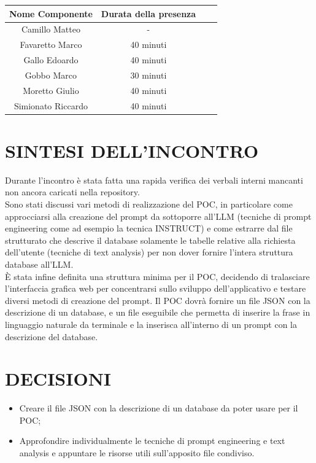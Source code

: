 \documentclass[5pt]{article}
\begin{document}
	\begin{table}[ht]
		\begin{tabular}{|Sc|Sc|}
			\hline
			\textbf{Nome Componente} & \textbf{Durata della presenza} \\
			\hline
			Camillo Matteo & - \\
			Favaretto Marco & 40 minuti \\
			Gallo Edoardo & 40 minuti \\
			Gobbo Marco & 30 minuti \\
			Moretto Giulio & 40 minuti \\
			Simionato Riccardo & 40 minuti \\
			\hline
		\end{tabular}
		\label{tab:conference}
	\end{table}
	
	\section{SINTESI DELL'INCONTRO}
	Durante l'incontro è stata fatta una rapida verifica dei verbali interni mancanti non ancora caricati nella repository.\\
	Sono stati discussi vari metodi di realizzazione del POC, in particolare come approcciarsi alla creazione del prompt da sottoporre all'LLM (tecniche di prompt engineering come ad esempio la tecnica INSTRUCT) e come estrarre dal file strutturato che descrive il database solamente le tabelle relative alla richiesta dell'utente (tecniche di text analysis) per non dover fornire l'intera struttura database all'LLM.\\
	È stata infine definita una struttura minima per il POC, decidendo di tralasciare l'interfaccia grafica web per concentrarsi sullo sviluppo dell'applicativo e testare diversi metodi di creazione del prompt. Il POC dovrà fornire un file JSON con la descrizione di un database, e un file eseguibile che permetta di inserire la frase in linguaggio naturale da terminale e la inserisca all'interno di un prompt con la descrizione del database.
	
	\section{DECISIONI}
	\begin{itemize}
		\item Creare il file JSON con la descrizione di un database da poter usare per il POC;
		\item Approfondire individualmente le tecniche di prompt engineering e text analysis e appuntare le risorse utili sull'apposito file condiviso.
	\end{itemize}
	
\end{document}
